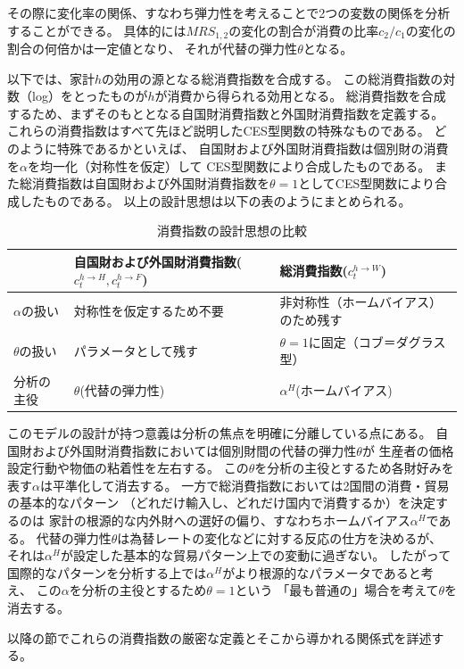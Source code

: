 その際に変化率の関係、すなわち弾力性を考えることで2つの変数の関係を分析することができる。
具体的には\(MRS_{1,2}\)の変化の割合が消費の比率\(c_2/c_1\)の変化の割合の何倍かは一定値となり、
それが代替の弾力性\(\theta\)となる。

以下では、家計\(h\)の効用の源となる総消費指数を合成する。
この総消費指数の対数（log）をとったものが\(h\)が消費から得られる効用となる。
総消費指数を合成するため、まずそのもととなる自国財消費指数と外国財消費指数を定義する。
これらの消費指数はすべて先ほど説明したCES型関数の特殊なものである。
どのように特殊であるかといえば、
自国財および外国財消費指数は個別財の消費を\(\alpha\)を均一化（対称性を仮定）して
CES型関数により合成したものである。
また総消費指数は自国財および外国財消費指数を\(\theta=1\)としてCES型関数により合成したものである。
以上の設計思想は以下の表のようにまとめられる。

\begin{table}[H]
    \centering
    \caption{消費指数の設計思想の比較}
    \label{tab:model_households_indices_philosophy}
    \begin{tabular}{lll}
        \toprule
        & 自国財および外国財消費指数(\(c_t^{h\to H},c_t^{h\to F}\)) & 総消費指数(\(c_t^{h\to W}\)) \\
        \midrule
        \(\alpha\)の扱い & 対称性を仮定するため不要 & 非対称性（ホームバイアス）のため残す \\
        \(\theta\)の扱い & パラメータとして残す & \(\theta=1\)に固定（コブ＝ダグラス型） \\
        分析の主役 & \(\theta\)(代替の弾力性) & \(\alpha^H\)(ホームバイアス) \\
        \bottomrule
    \end{tabular}
\end{table}

このモデルの設計が持つ意義は分析の焦点を明確に分離している点にある。
自国財および外国財消費指数においては個別財間の代替の弾力性\(\theta\)が
生産者の価格設定行動や物価の粘着性を左右する。
この\(\theta\)を分析の主役とするため各財好みを表す\(\alpha\)は平準化して消去する。
一方で総消費指数においては2国間の消費・貿易の基本的なパターン
（どれだけ輸入し、どれだけ国内で消費するか）を決定するのは
家計の根源的な内外財への選好の偏り、すなわちホームバイアス\(\alpha^H\)である。
代替の弾力性\(\theta\)は為替レートの変化などに対する反応の仕方を決めるが、
それは\(\alpha^H\)が設定した基本的な貿易パターン上での変動に過ぎない。
したがって国際的なパターンを分析する上では\(\alpha^H\)がより根源的なパラメータであると考え、
この\(\alpha\)を分析の主役とするため\(\theta=1\)という
「最も普通の」場合を考えて\(\theta\)を消去する。

以降の節でこれらの消費指数の厳密な定義とそこから導かれる関係式を詳述する。